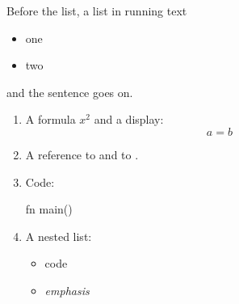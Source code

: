 Before the list, a list in running text \begin{itemize}\item one\item two\end{itemize} and the sentence goes on.

\begin{enumerate}
\item\flmLabels{\label{ref1}} A formula \(x^2\) and a display:
\[ a = b \]
\item A reference to  and to .
\item\flmLabels{\label{ref2}} Code:
\begin{flmVerbatimCode}[]
fn main() {}
\end{flmVerbatimCode}
\item A nested list:
\begin{itemize}\item{} code\item\emph{emphasis}\end{itemize}
\end{enumerate}%
\RequirePackage{fvextra}
\RequirePackage{zref-clever}
%
%
